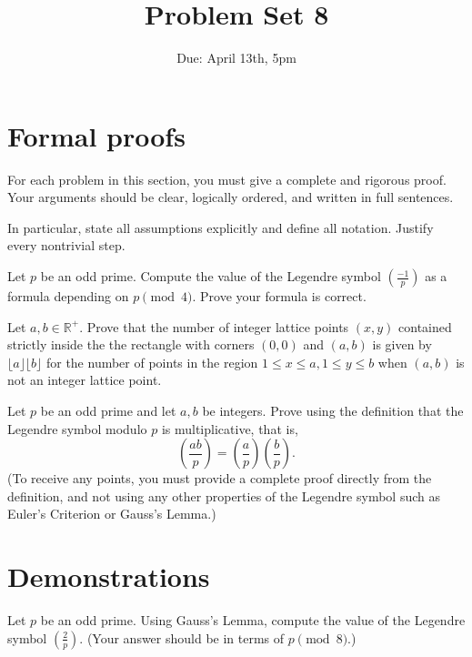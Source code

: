 \documentclass[12pt]{exam}
\begin{document}
\title{Problem Set 8}
\date{Due: April 13th, 5pm}
\maketitle



\section{Formal proofs}
For each problem in this section, you must give a complete and rigorous proof. Your arguments should be clear, logically ordered, and written in full sentences.

In particular, state all assumptions explicitly and define all notation. Justify every nontrivial step. 

\begin{questions}
\question[1] Let $p$ be an odd prime. Compute the value of the Legendre symbol $\left(\frac{-1}{p}\right)$ as a formula depending on $p \pmod{4}$. Prove your formula is correct. 

\question[1] Let $a, b \in \mathbb{R}^+$. Prove that the number of integer lattice points $(x, y)$ contained strictly inside the the rectangle with corners $(0,0)$ and $(a,b)$ is given by $\lfloor a \rfloor \lfloor b \rfloor$ for the number of points in the region $1 \le x \le a, 1 \le y \le b$ when $(a, b)$ is not an integer lattice point.

\question[1] Let $p$ be an odd prime and let $a, b$ be integers. Prove using the definition that the Legendre symbol modulo $p$ is multiplicative, that is,
$$\left(\frac{ab}{p}\right) = \left(\frac{a}{p}\right)\left(\frac{b}{p}\right).$$
(To receive any points, you must provide a complete proof directly from the definition, and not using any other properties of the Legendre symbol such as Euler's Criterion or Gauss's Lemma.)

\section{Demonstrations}

\question[1] Let $p$ be an odd prime. Using Gauss's Lemma, compute the value of the Legendre symbol $\left(\frac{2}{p}\right)$. (Your answer should be in terms of $p \pmod{8}$.)


\end{questions}
\end{document}
